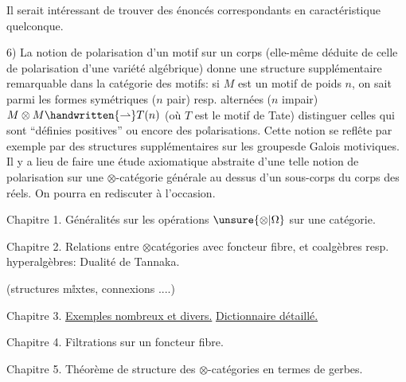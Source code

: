 Il serait intéressant de trouver des énoncés correspondants en caractéristique quelconque.

6) La notion de polarisation d'un motif sur un corps (elle-même déduite de celle de polarisation d'une variété algébrique) donne une structure supplémentaire remarquable dans la catégorie des motifs: si $M$ est un motif de poids $n$, on sait parmi les formes symétriques ($n$ pair) resp. alternées ($n$ impair) $M\otimes M\handwritten{\rightharpoonup} T(n)$ (où $T$ est le motif de Tate) distinguer celles qui sont ``définies positives'' ou encore des po$\mathbb{l}$arisations. Cette notion se reflête par exemple par des structures supplémentaires sur les groupesde Galois motiviques. Il y a lieu de faire une étude axiomatique abstraite d'une telle notion de polarisation sur une $\otimes$-catégorie générale au dessus d'un  sous-corps du corps des réels. On pourra en rediscuter à l'occasion.



Chapitre 1. Généralités sur les opérations $\unsure{\otimes|\Omega}$ sur une catégorie.


Chapitre 2. Relations entre $\otimes$\deleted{-}catégories  avec foncteur fibre, et coalgèbres resp. hyperalgèbres:  Dualité de Tannaka.

\hfill (structures m$\mathbb{i}$xtes, connexions ....)

Chapitre 3. \uline{Exemples nombreux et divers.} \uline{Dictionnaire détaillé.}

Chapitre 4. Filtrations sur un foncteur fibre.

Chapitre 5. Théorème de structure des $\otimes$-catégories en termes de gerbes.

